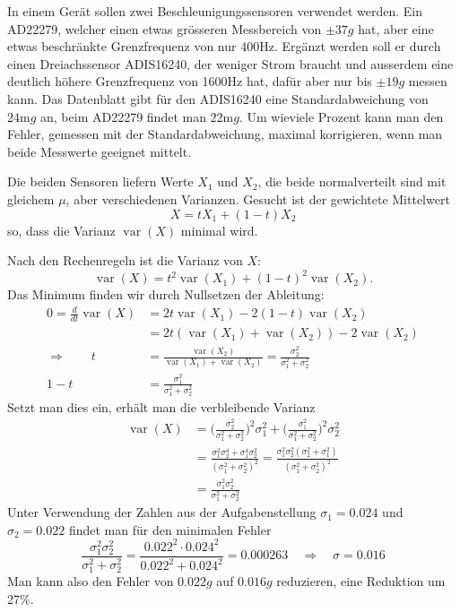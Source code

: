 In einem Gerät sollen zwei Beschleunigungssensoren verwendet
werden. Ein AD22279, welcher einen etwas grösseren Messbereich von
$\pm37g$ hat, aber eine etwas beschränkte Grenzfrequenz von nur 400Hz.
Ergänzt werden soll er durch einen Dreiachssensor ADIS16240,
der weniger Strom braucht und ausserdem eine deutlich höhere
Grenzfrequenz von 1600Hz hat, dafür aber nur bis $\pm19g$ messen kann.
Das Datenblatt gibt für den ADIS16240 eine Standardabweichung von
$24\text{m}g$ an, beim AD22279 findet man $22\text{m}g$.
Um wieviele Prozent kann man den Fehler, gemessen mit
der Standardabweichung, maximal korrigieren, wenn man beide
Messwerte geeignet mittelt.


\begin{loesung}
Die beiden Sensoren liefern Werte $X_1$ und $X_2$, die
beide normalverteilt sind mit gleichem $\mu$, aber verschiedenen
Varianzen. Gesucht ist der gewichtete Mittelwert
\[
X=tX_1+(1-t)X_2
\]
so, dass die Varianz $\operatorname{var}(X)$ minimal wird.

Nach den Rechenregeln ist die Varianz von $X$:
\[
\operatorname{var}(X)=t^2\operatorname{var}(X_1)+(1-t)^2\operatorname{var}(X_2).
\]
Das Minimum finden wir durch Nullsetzen der Ableitung:
\begin{align*}
0=\frac{d}{dt}\operatorname{var}(X)
&=
2t\operatorname{var}(X_1)-2(1-t)\operatorname{var}(X_2)
\\
&=
2t(\operatorname{var}(X_1)+\operatorname{var}(X_2)) -2\operatorname{var}(X_2)
\\
\Rightarrow\qquad
t&=\frac{\operatorname{var}(X_2)}{\operatorname{var}(X_1)+\operatorname{var}(X_2)}
=\frac{\sigma_2^2}{\sigma_1^2+\sigma_2^2}
\\
1-t&=
\frac{\sigma_1^2}{\sigma_1^2+\sigma_2^2}
\end{align*}
Setzt man dies ein, erhält man die verbleibende Varianz
\begin{align*}
\operatorname{var}(X)
&=
\biggl(
\frac{\sigma_2^2}{\sigma_1^2+\sigma_2^2}
\biggr)^2
\sigma_1^2
+
\biggl(
\frac{\sigma_1^2}{\sigma_1^2+\sigma_2^2}
\biggr)^2
\sigma_2^2
\\
&=\frac{\sigma_1^2\sigma_2^4+\sigma_1^4\sigma_2^2}{(\sigma_1^2+\sigma_2^2)^2}
=\frac{\sigma_1^2\sigma_2^2(\sigma_2^2+\sigma_1^2)}{(\sigma_1^2+\sigma_2^2)^2}
\\
&=
\frac{\sigma_1^2\sigma_2^2}{\sigma_1^2+\sigma_2^2}
\end{align*}
Unter Verwendung der Zahlen aus der Aufgabenstellung
$\sigma_1=0.024$ und $\sigma_2=0.022$ findet man für
den minimalen Fehler
\[
\frac{\sigma_1^2\sigma_2^2}{\sigma_1^2+\sigma_2^2}=\frac{0.022^2\cdot 0.024^2}{0.022^2+0.024^2}=0.000263
\quad\Rightarrow\quad
\sigma
=0.016
\]
Man kann also den Fehler von $0.022g$ auf
$0.016g$ reduzieren, eine Reduktion um 27\%.
\end{loesung}

